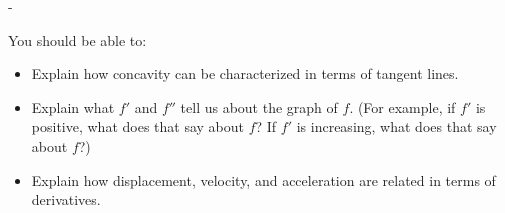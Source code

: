 \documentclass{article}
\makeatletter
\newlength{\tipmargin}
\renewenvironment{framed}{
  \setlength{\tipmargin}{\textwidth-\linewidth}
  \advance\@totalleftmargin-\tipmargin
  \def\FrameCommand{\hspace{\tipmargin}\fbox}%
  \advance\linewidth\tipmargin
  \MakeFramed {\advance\hsize-\width \FrameRestore}%
}
{\endMakeFramed}
\makeatother
\begin{document}

\begin{problemonly}
  \begin{framed}

You should be able to:
    \begin{itemize}[topsep=0pt,partopsep=0pt,parsep=8pt,itemsep=0pt]

    \item Explain how concavity can be characterized in terms of tangent lines.

    \item Explain what $f'$ and $f''$ tell us about the graph of $f$. (For example, if $f'$ is positive, what does that say about $f$? If $f'$ is increasing, what does that say about $f$?)

    \item Explain how displacement, velocity, and acceleration are related in terms of derivatives.

    \end{itemize}
  \end{framed}
\end{problemonly}
\end{document}
